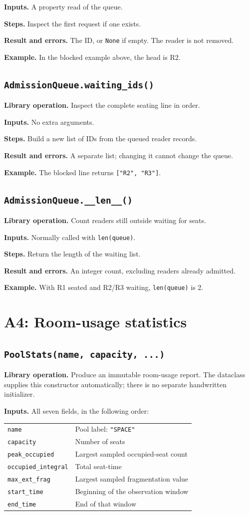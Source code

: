 \documentclass[11pt,a4paper]{article}
\newcommand{\routine}[2]{\subsection{\texorpdfstring{\texttt{#1}}{#2}}}
\newcommand{\librarymeaning}{\textbf{Library operation.} }
\newcommand{\arguments}{\textbf{Inputs.} }
\newcommand{\steps}{\textbf{Steps.} }
\newcommand{\result}{\textbf{Result and errors.} }
\newcommand{\example}{\textbf{Example.} }
\begin{document}
\arguments A property read of the queue.

\steps Inspect the first request if one exists.

\result The ID, or \texttt{None} if empty. The reader is not removed.

\example In the blocked example above, the head is R2.

\routine{AdmissionQueue.waiting\_ids()}{AdmissionQueue waiting IDs}
\librarymeaning Inspect the complete seating line in order.

\arguments No extra arguments.

\steps Build a new list of IDs from the queued reader records.

\result A separate list; changing it cannot change the queue.

\example The blocked line returns \texttt{["R2", "R3"]}.

\routine{AdmissionQueue.\_\_len\_\_()}{AdmissionQueue length}
\librarymeaning Count readers still outside waiting for seats.

\arguments Normally called with \texttt{len(queue)}.

\steps Return the length of the waiting list.

\result An integer count, excluding readers already admitted.

\example With R1 seated and R2/R3 waiting, \texttt{len(queue)} is 2.

\section{A4: Room-usage statistics}

\routine{PoolStats(name, capacity, ...)}{PoolStats constructor}
\librarymeaning Produce an immutable room-usage report. The dataclass supplies
this constructor automatically; there is no separate handwritten initializer.

\arguments All seven fields, in the following order:
\begin{center}
\begin{tabular}{ll}
\texttt{name} & Pool label: \texttt{"SPACE"} \\
\texttt{capacity} & Number of seats \\
\texttt{peak\_occupied} & Largest sampled occupied-seat count \\
\texttt{occupied\_integral} & Total seat-time \\
\texttt{max\_ext\_frag} & Largest sampled fragmentation value \\
\texttt{start\_time} & Beginning of the observation window \\
\texttt{end\_time} & End of that window
\end{tabular}
\end{center}
\end{document}
